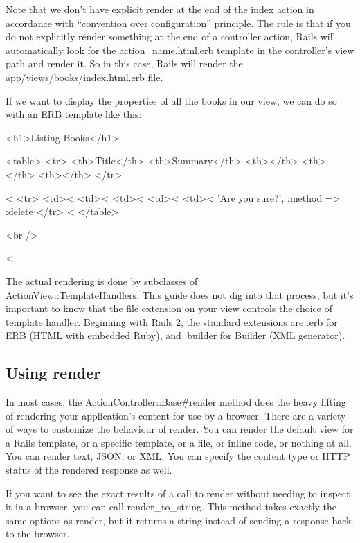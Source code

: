 \documentclass[10pt]{book}
\newenvironment{code}{%
  \scriptsize
    \verbatim
}{%
    \endverbatim
    \newline
}
\begin{document}
Note that we don’t have explicit render at the end of the index  action in accordance with “convention over configuration” principle. The  rule is that if you do not explicitly render something at the end of a  controller action, Rails will automatically look for the action\_name.html.erb template in the controller’s view path and render it. So in this case, Rails will render the app/views/books/index.html.erb file.

If we want to display the properties of all the books in our view, we can do so with an ERB template like this:
\begin{code}
<h1>Listing Books</h1>
 
<table>
  <tr>
    <th>Title</th>
    <th>Summary</th>
    <th></th>
    <th></th>
    <th></th>
  </tr>
 
<%
  <tr>
    <td><%
    <td><%
    <td><%
    <td><%
    <td><%
        'Are you sure?', :method => :delete %
  </tr>
<%
</table>
 
<br />
 
<%
\end{code}

The actual rendering is done by subclasses of \\ ActionView::TemplateHandlers.  This guide does not dig into that process, but it’s important to know  that the file extension on your view controls the choice of template  handler. Beginning with Rails 2, the standard extensions are .erb for ERB (HTML with embedded Ruby), and .builder for Builder (XML generator).

\subsection{ Using render}

In most cases, the ActionController::Base\#render method does  the heavy lifting of rendering your application’s content for use by a  browser. There are a variety of ways to customize the behaviour of render.  You can render the default view for a Rails template, or a specific  template, or a file, or inline code, or nothing at all. You can render  text, JSON, or XML. You can specify the content type or HTTP status of the rendered response as well.

If you want to see the exact results of a call to render without needing to inspect it in a browser, you can call render\_to\_string. This method takes exactly the same options as render, but it returns a string instead of sending a response back to the browser.
\end{document}
